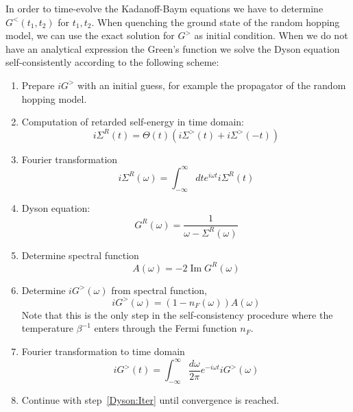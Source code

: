 \documentclass[prx,aps,onecolumn,amsfonts,showpacs,superscriptaddress,preprint,eqsecnum]
{revtex4-1}
\begin{document}
In order to time-evolve the Kadanoff-Baym equations we have to determine $G^{<}(t_1,t_2)$ for $t_1,t_2$. When quenching the ground state of the random hopping model, we can use the exact solution for $G^>$ as initial condition. When we do not have an analytical expression the Green's function we solve the 
Dyson equation self-consistently according to the following scheme:
\begin{enumerate}
	\item Prepare $i G^>$ with an initial guess, for example the propagator of 
the random hopping model.
	\item \label{Dyson:Iter} Computation of retarded self-energy in time domain:
	\begin{equation}
		i\Sigma^R(t) = \Theta(t)(i \Sigma^>(t) + i\Sigma^>(-t))
	\end{equation}
	\item Fourier transformation
	\begin{equation}
		i\Sigma^R(\omega) = \int_{-\infty}^\infty dt e^{i \omega t} i\Sigma^R(t)
	\end{equation}
	\item Dyson equation:
	\begin{equation}
		G^R(\omega) = \frac{1}{\omega - \Sigma^R(\omega)}
	\end{equation}
	\item Determine spectral function
	\begin{equation}
		A(\omega) = -2 \operatorname{Im} G^R(\omega)
	\end{equation}
	\item Determine $i G^>(\omega)$ from spectral function,
	\begin{equation}
		i G^>(\omega) = (1 - n_F(\omega)) A(\omega)
	\end{equation}
	Note that this is the only step in the self-consistency procedure where 
the temperature $\beta^{-1}$ enters through the Fermi function $n_F$.
	\item Fourier transformation to time domain
	\begin{equation}
		iG^>(t) = \int_{-\infty}^\infty \frac{d\omega}{2\pi} e^{-i \omega t} 
iG^>(\omega)
	\end{equation}
	\item Continue with step~\ref{Dyson:Iter} until convergence is reached.
\end{enumerate}
\end{document}
